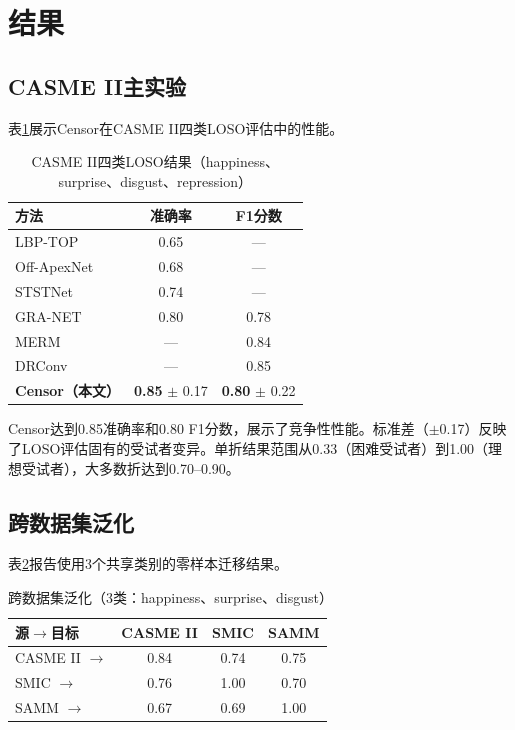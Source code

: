 
\section{结果}

\subsection{CASME II主实验}

表\ref{tab:main_results_cn}展示Censor在CASME II四类LOSO评估中的性能。

\begin{table}[htbp]
\centering
\caption{CASME II四类LOSO结果（happiness、surprise、disgust、repression）}
\label{tab:main_results_cn}
\begin{tabular}{lcc}
\toprule
方法 & 准确率 & F1分数 \\
\midrule
LBP-TOP\cite{zhao2007lbptop} & 0.65 & --- \\
Off-ApexNet\cite{wang2015offapexnet} & 0.68 & --- \\
STSTNet\cite{ststnet2021} & 0.74 & --- \\
GRA-NET\cite{graNet2021} & 0.80 & 0.78 \\
MERM\cite{merm2023} & --- & 0.84 \\
DRConv\cite{drconv2024} & --- & 0.85 \\
\textbf{Censor（本文）} & \textbf{0.85} $\pm$ 0.17 & \textbf{0.80} $\pm$ 0.22 \\
\bottomrule
\end{tabular}
\end{table}

Censor达到0.85准确率和0.80 F1分数，展示了竞争性性能。标准差（$\pm$0.17）反映了LOSO评估固有的受试者变异。单折结果范围从0.33（困难受试者）到1.00（理想受试者），大多数折达到0.70--0.90。

\subsection{跨数据集泛化}

表\ref{tab:cross_dataset_cn}报告使用3个共享类别的零样本迁移结果。

\begin{table}[htbp]
\centering
\caption{跨数据集泛化（3类：happiness、surprise、disgust）}
\label{tab:cross_dataset_cn}
\begin{tabular}{lccc}
\toprule
源$\rightarrow$目标 & CASME II & SMIC & SAMM \\
\midrule
CASME II $\rightarrow$ & 0.84 & 0.74 & 0.75 \\
SMIC $\rightarrow$ & 0.76 & 1.00 & 0.70 \\
SAMM $\rightarrow$ & 0.67 & 0.69 & 1.00 \\
\bottomrule
\end{tabular}
\end{table}

